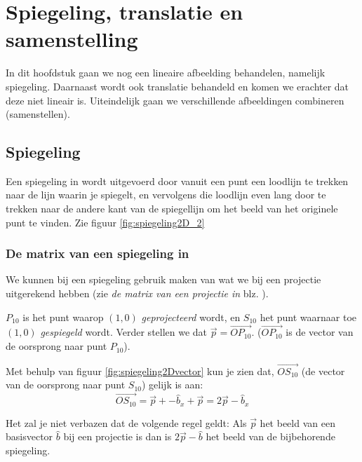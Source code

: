 \chapter{Spiegeling, translatie en samenstelling}
\label{chap: Spiegeling, translatie en samenstelling}
In dit hoofdstuk gaan we nog een lineaire afbeelding behandelen, namelijk spiegeling. Daarnaast wordt ook translatie behandeld en komen we erachter dat deze niet lineair is. Uiteindelijk gaan we verschillende afbeeldingen combineren (samenstellen).

\section{Spiegeling}
Een spiegeling in \RT wordt uitgevoerd door vanuit een punt een loodlijn te trekken naar de lijn waarin je spiegelt, en vervolgens die loodlijn even lang door te trekken naar de andere kant van de spiegellijn om het beeld van het originele punt te vinden. Zie figuur \ref{fig:spiegeling2D_2}

\subsection{De matrix van een spiegeling in \RT}
 We kunnen bij een spiegeling gebruik maken van wat we bij een projectie uitgerekend hebben (zie \textit{de matrix van een projectie in \RT} blz. \pageref{projectie2D}). 

$P_{10}$ is het punt waarop $(1,0)$ \textit{geprojecteerd} wordt, en $S_{10} $ het punt waarnaar toe $(1,0)$ \textit{gespiegeld} wordt. Verder stellen we dat $\vec{p} = \overrightarrow{OP_{10}}$. ($\overrightarrow{OP_{10}}$ is de vector van de oorsprong naar punt $P_{10}$). 

Met behulp van figuur \ref{fig:spiegeling2Dvector} kun je zien dat, $\overrightarrow{OS_{10}}$ (de vector van de oorsprong naar punt $S_{10}$) gelijk is aan: 
\[
    \overrightarrow{OS_{10}} = \vec{p} + -\hat{b}_x + \vec{p} = 2\vec{p} - \hat{b}_x
\]  

Het zal je  niet verbazen dat de volgende regel geldt: Als $\vec{p} $ het beeld van een basisvector $ \hat{b}  $  bij een projectie is dan is $ 2 \vec{p}  - \hat{b} $ het beeld van de bijbehorende spiegeling.  

